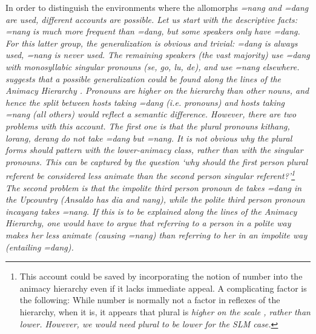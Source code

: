 

In order to distinguish the environments where the allomorphs \em =nang \em and \em =dang \em are used, different accounts are possible. Let us start with the descriptive facts: \em =nang \em is much more frequent than \em =dang\em, but some speakers only have \em =dang\em. For this latter group, the generalization is obvious and trivial: \em =dang \em is always used, \em =nang \em is never used. The remaining speakers (the vast majority) use \em =dang \em with monosyllabic singular pronouns (\em se,  go, lu, de\em), and use \em =nang \em elsewhere. \citet{Ansaldo2005ms, Ansaldo2008genesis, Ansaldo2009book} suggests that a possible generalization could be found along the lines of the Animacy Hierarchy \citep{Silverstein1976}.  Pronouns are higher on the hierarchy than other nouns, and hence the split between hosts taking \em =dang \em (i.e. pronouns) and hosts taking \em =nang \em (all others) would reflect a semantic difference. However, there are two problems with this account. The first one is that the plural pronouns \em kithang, lorang, derang \em do not take \em =dang \em but \em =nang\em. It is not obvious why the plural forms should pattern with the lower-animacy class, rather than with the singular pronouns. This can be captured by the question `why should the first person plural referent be considered less animate than the second person singular referent?'\footnote{This account could be saved by incorporating the notion of number into the animacy hierarchy even if it lacks immediate appeal. A complicating factor is the following: While number is normally not a factor in reflexes of the hierarchy, when it is, it appears that plural is \em higher \em on the scale \citep[126]{Silverstein1976}, rather than lower. However, we would need plural to be lower for the SLM case.} The second problem is that the impolite third person pronoun \em de \em takes \em =dang \em in the Upcountry (Ansaldo has \em dia \em and \em nang\em), while the polite third person pronoun \em incayang \em takes \em =nang\em. If this is to be explained along the lines of the Animacy Hierarchy, one would have to argue that  referring to a person in a polite way makes her less animate (causing \em =nang\em) than referring to her in an impolite way (entailing \em =dang\em).

